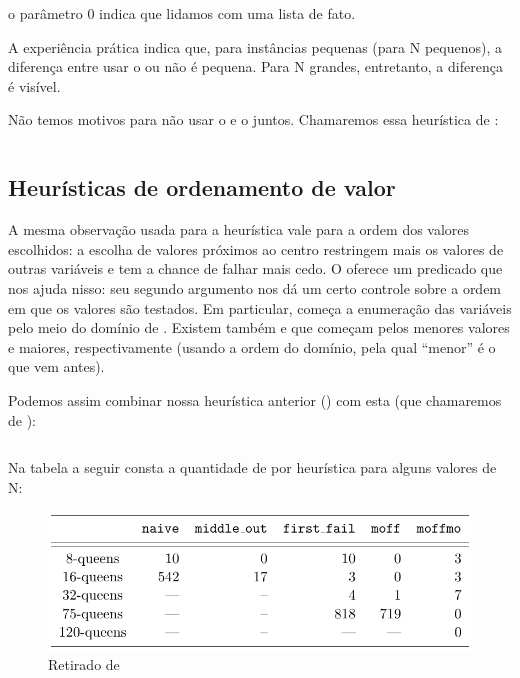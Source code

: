 \documentclass{article}
\begin{document}
    \inputminted{prolog}{../Exemplos/Cap11/prog4_queensHeurFrstFail.ecl}

\indent o parâmetro 0 indica que lidamos com uma lista de fato.

A experiência prática indica que, para instâncias pequenas (para N pequenos), a diferença entre usar
o  ou não é pequena. Para N grandes, entretanto, a diferença é visível.

Não temos motivos  para não usar o  e o
 juntos. Chamaremos essa heurística de :

    \inputminted{prolog}{../Exemplos/Cap11/prog5_queensHeurMoff.ecl}

\subsection{Heurísticas de ordenamento de valor}

A mesma observação usada para a heurística  vale para a ordem dos valores
escolhidos: a escolha de valores próximos ao centro restringem mais os valores de outras variáveis e
tem a chance de falhar mais cedo. O \eclipse oferece um predicado  que nos ajuda
nisso: seu segundo argumento nos dá um certo controle sobre a ordem em que os valores são testados.
Em particular,  começa a enumeração das variáveis pelo meio do domínio
de . Existem também  e  que começam
pelos menores valores e maiores, respectivamente (usando a ordem do domínio, pela qual ``menor'' é o
que vem antes).

Podemos assim combinar nossa heurística anterior () com esta (que chamaremos de
):

    \inputminted{prolog}{../Exemplos/Cap11/prog6_queensHeurMoffMo.ecl}

Na tabela a seguir consta a quantidade de  por heurística para alguns
valores de N:

\begin{figure}[h]
  \caption{Retirado de \cite{krzysztof}}\label{fig:psi}
  \centering
  \includegraphics[scale=0.5]{HeuristicsBacktrack.png}
\end{figure}
\end{document}
